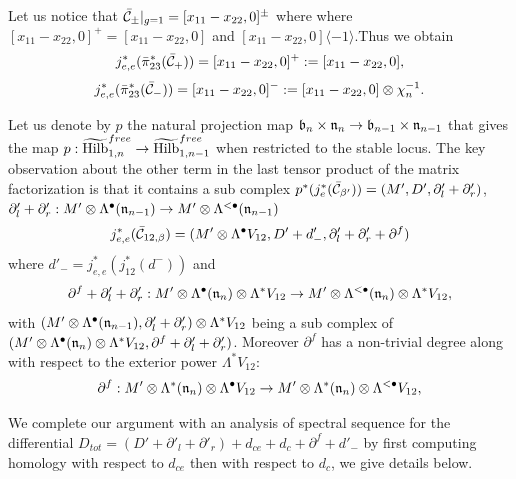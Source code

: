 \documentclass[10pt]{amsart}
\begin{document}
Let us notice that $\bar{\mathcal{C}}_{\pm}|_{g=1}=[x_{11}-x_{22},0]^{\pm}$ where where $[x_{11}-x_{22},0]^+=[x_{11}-x_{22},0]$ and $[x_{11}-x_{22},0]\langle -1\rangle$.Thus we obtain
\[ j_{e,e}^*(\bar{\pi}^*_{23}(\bar{\mathcal{C}}_{+}))=[x_{11}-x_{22},0]^+:=[x_{11}-x_{22},0],\]
\[j_{e,e}^*(\bar{\pi}^*_{23}(\bar{\mathcal{C}}_{-}))=[x_{11}-x_{22},0]^-:=[x_{11}-x_{22},0]\otimes \chi_n^{-1}.\]

Let us denote by $p$ the natural projection map $\mathfrak{b}_n\times \mathfrak{n}_n\to \mathfrak{b}_{n-1}\times \mathfrak{n}_{n-1}$ that gives the map $p:\widetilde{\mathrm{Hilb}}^{free}_{1,n}\to \widetilde{\mathrm{Hilb}}^{free}_{1,n-1}$ when
restricted to the stable locus.
The key observation about the other term in the last tensor product of the matrix factorization is that it contains a sub complex $p^*(j_{e}^*(\bar{\mathcal{C}}_{\beta'}))=(M',D',\partial'_l+\partial_r')$,
$\partial'_l+\partial_r':M'\otimes \Lambda^\bullet(\mathfrak{n}_{n-1})\to M'\otimes \Lambda^{<\bullet}(\mathfrak{n}_{n-1})$
$$j_{e,e}^*(\bar{\mathcal{C}}_{12,\beta})=(M'\otimes \Lambda^\bullet V_{12},D'+d'_-,\partial'_l+\partial'_r+\partial^f)$$
where $d'_-=j_{e,e}^*(j_{12}^*(d^-))$ and $$\partial^f+\partial'_l+\partial'_r: M'\otimes \Lambda^\bullet(\mathfrak{n}_{n})\otimes \Lambda^* V_{12}\to M'\otimes \Lambda^{<\bullet}(\mathfrak{n}_{n})\otimes \Lambda^* V_{12},$$
with $(M'\otimes \Lambda^\bullet (\mathfrak{n}_{n-1}),\partial'_l+\partial'_r)\otimes \Lambda^* V_{12}$ being a sub complex of $( M'\otimes \Lambda^\bullet(\mathfrak{n}_{n})\otimes \Lambda^* V_{12},\partial^f+\partial'_l+\partial'_r)$.
Moreover $\partial^f$ has a non-trivial degree along with respect to the exterior power $\Lambda^* V_{12}$:
$$\partial^f: M'\otimes \Lambda^*(\mathfrak{n}_{n})\otimes \Lambda^\bullet V_{12}\to M'\otimes \Lambda^{*}(\mathfrak{n}_{n})\otimes \Lambda^{<\bullet} V_{12},$$

We complete our argument with an analysis of spectral sequence for the differential $D_{tot}=(D'+\partial'_l+\partial'_r)+d_{ce}+d_c+\partial^f+d'_-$ by first
computing homology with respect to $d_{ce}$ then with respect to $d_c$, we give details below.
\end{document}
